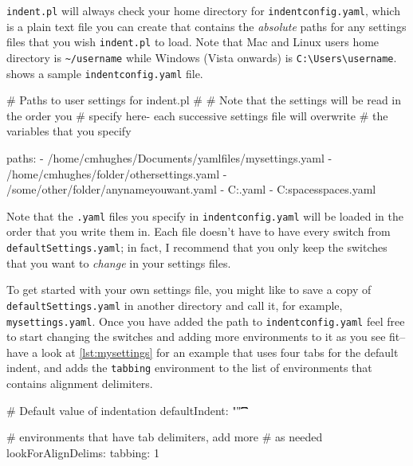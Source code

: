  	\lstinline!indent.pl! will always check your home directory for \lstinline!indentconfig.yaml!, 
 	which is a plain text file you can create that contains the \emph{absolute}
 	paths for any settings files that you wish \lstinline!indent.pl! to load.
 	Note that Mac and Linux users home directory is \lstinline!~/username! while
 	Windows (Vista onwards) is \lstinline!C:\Users\username!. 
 	 shows a sample \lstinline!indentconfig.yaml! file.
 	 	
 	\begin{yaml}[caption={\lstinline!indentconfig.yaml!},label={lst:indentconfig}]
# Paths to user settings for indent.pl
#
# Note that the settings will be read in the order you 
# specify here- each successive settings file will overwrite
# the variables that you specify

paths:
- /home/cmhughes/Documents/yamlfiles/mysettings.yaml
- /home/cmhughes/folder/othersettings.yaml
- /some/other/folder/anynameyouwant.yaml
- C:\Users\chughes\Documents\mysettings.yaml
- C:\Users\chughes\Desktop\test spaces\more spaces.yaml
 	\end{yaml}
 	 	
 	Note that the \lstinline!.yaml! files you specify in \lstinline!indentconfig.yaml!
 	will be loaded in the order that you write them in. Each file doesn't have 
 	to have every switch from \lstinline!defaultSettings.yaml!; in fact, I recommend 
 	that you only keep the switches that you want to \emph{change} in your 
 	settings files.
 	 	
 	To get started with your own settings file, you might like to save a copy of 
 	\lstinline!defaultSettings.yaml! in another directory and call it, for 
 	example, \lstinline!mysettings.yaml!. Once you have added the path to \lstinline!indentconfig.yaml!
 	feel free to start changing the switches and adding more environments to it 
 	as you see fit-- have a look at \cref{lst:mysettings} for an example 
 	that uses four tabs for the default indent, and adds the \lstinline!tabbing!
 	environment to the list of environments that contains alignment delimiters.
 	 	
 	\begin{yaml}[caption={\lstinline!mysettings.yaml! (example)},label={lst:mysettings}]
# Default value of indentation
defaultIndent: "\t\t\t\t"

# environments that have tab delimiters, add more 
# as needed
lookForAlignDelims:
   tabbing: 1
 	\end{yaml}
 	 	
